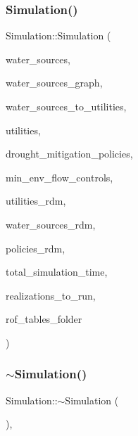 \subsubsection{\texorpdfstring{Simulation()}{Simulation()}\hspace{0.1cm}{\footnotesize\ttfamily [3/3]}}
{\footnotesize\ttfamily Simulation\+::\+Simulation (\begin{DoxyParamCaption}\item[{vector$<$ \mbox{\hyperlink{classWaterSource}{Water\+Source}} $\ast$$>$ \&}]{water\+\_\+sources,  }\item[{\mbox{\hyperlink{classGraph}{Graph}} \&}]{water\+\_\+sources\+\_\+graph,  }\item[{const vector$<$ vector$<$ int $>$$>$ \&}]{water\+\_\+sources\+\_\+to\+\_\+utilities,  }\item[{vector$<$ \mbox{\hyperlink{classUtility}{Utility}} $\ast$$>$ \&}]{utilities,  }\item[{const vector$<$ \mbox{\hyperlink{classDroughtMitigationPolicy}{Drought\+Mitigation\+Policy}} $\ast$$>$ \&}]{drought\+\_\+mitigation\+\_\+policies,  }\item[{vector$<$ \mbox{\hyperlink{classMinEnvFlowControl}{Min\+Env\+Flow\+Control}} $\ast$$>$ \&}]{min\+\_\+env\+\_\+flow\+\_\+controls,  }\item[{vector$<$ vector$<$ double $>$$>$ \&}]{utilities\+\_\+rdm,  }\item[{vector$<$ vector$<$ double $>$$>$ \&}]{water\+\_\+sources\+\_\+rdm,  }\item[{vector$<$ vector$<$ double $>$$>$ \&}]{policies\+\_\+rdm,  }\item[{const unsigned long}]{total\+\_\+simulation\+\_\+time,  }\item[{vector$<$ unsigned long $>$ \&}]{realizations\+\_\+to\+\_\+run,  }\item[{string \&}]{rof\+\_\+tables\+\_\+folder }\end{DoxyParamCaption})}

\mbox{\label{classSimulation_a80fad3f57dfaf195a36f7bc49bc88279_a80fad3f57dfaf195a36f7bc49bc88279}} 
\subsubsection{\texorpdfstring{$\sim$\+Simulation()}{~Simulation()}}
{\footnotesize\ttfamily Simulation\+::$\sim$\+Simulation (\begin{DoxyParamCaption}{ }\end{DoxyParamCaption})\hspace{0.3cm}{\ttfamily [virtual]}, {\ttfamily [default]}}



